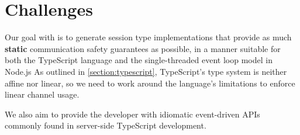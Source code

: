 \section{Challenges}
\label{section:nodechallenges}

Our goal with  is to
generate session type implementations that
provide as much \textbf{static} communication safety guarantees
as possible,
in a manner suitable for both the TypeScript language 
and the single-threaded event loop model in Node.js
As outlined in \cref{section:typescript}, TypeScript's type system
is neither affine nor linear, so we need to work around the 
language's limitations to enforce linear channel usage.

We also aim to provide the developer with
idiomatic event-driven APIs commonly found in
server-side TypeScript development.